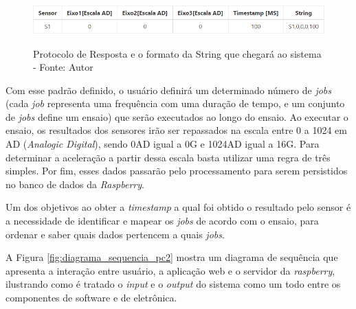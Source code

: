 \begin{figure}[H]
\centering
\includegraphics[keepaspectratio=true,scale=0.8]{figuras/protocolo_string.png}
\label{fig:protocolo_string}
\caption{Protocolo de Resposta e o formato da String que chegará ao sistema - Fonte: Autor}
\end{figure}

Com esse padrão definido, o usuário definirá um determinado número de \textit{jobs} (cada \textit{job} representa uma frequência com uma duração de tempo, 
e um conjunto de \textit{jobs} define um ensaio) que serão executados ao longo do ensaio. Ao executar o ensaio, os resultados dos sensores irão ser 
repassados na escala entre 0 a 1024 em AD (\textit{Analogic Digital}), sendo 0AD igual a 0G e 1024AD igual a 16G. Para determinar a aceleração a 
partir dessa escala basta utilizar uma regra de três simples. Por fim, esses dados passarão pelo processamento para serem persistidos no
banco de dados da \textit{Raspberry}.

Um dos objetivos ao obter a \textit{timestamp} a qual foi obtido o resultado pelo sensor é a necessidade de identificar e mapear os
\textit{jobs} de acordo com o ensaio, para ordenar e saber quais dados pertencem a quais \textit{jobs}.

A Figura \ref{fig:diagrama_sequencia_pc2} mostra um diagrama de sequência que apresenta a interação entre usuário, a aplicação web e o servidor da \textit{raspberry},
ilustrando como é tratado o \textit{input} e o \textit{output} do sistema como um todo entre os componentes de software e de eletrônica.


